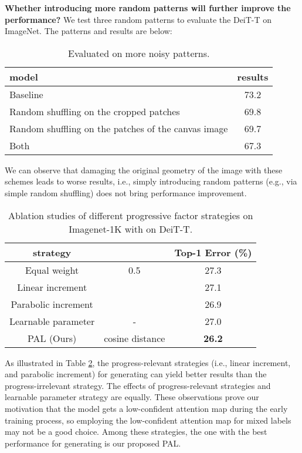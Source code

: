 \documentclass{article} \usepackage{iclr2023_conference,times}
\begin{document}
\textbf{Whether introducing more random patterns will further improve the performance?} We test three random patterns to evaluate the DeiT-T on ImageNet. The patterns and results are below:

\begin{table}[!htb]
\caption{Evaluated on more noisy patterns.}
\label{tabStra}
	\centering
	\begin{tabular}{lc}
    \toprule
     model  & results   \\
    \midrule

    Baseline   & 73.2   \\
    Random shuffling on the cropped patches	& 69.8\\
    Random shuffling on the patches of the canvas image & 69.7\\
    Both & 67.3\\
 
    \bottomrule
\end{tabular}
\end{table}
We can observe that damaging the original geometry of the image with these schemes leads to worse results, i.e., simply introducing random patterns (e.g., via simple random shuffling) does not bring performance improvement.

\begin{table}[!htb]
\caption{Ablation studies of different progressive factor strategies on Imagenet-1K with on DeiT-T.}
\label{tabStra}
	\centering
	\begin{tabular}{cc|c}
    \toprule
     strategy  &  & Top-1 Error (\%) \\
    \midrule

    Equal weight   & 0.5 & 27.3   \\
    
    Linear increment    &  & 27.1   \\
    
    Parabolic increment    &   & 26.9    \\
    Learnable parameter & - & 27.0  \\
    \midrule
    PAL (Ours)    & cosine distance  & \textbf{26.2}  \\
  
    \bottomrule
\end{tabular}
\end{table}

As illustrated in Table \ref{tabStra}, the progress-relevant strategies (i.e., linear increment, and parabolic increment) for generating  can yield better results than the progress-irrelevant strategy. The effects of progress-relevant strategies and learnable parameter strategy are equally. These observations prove our motivation that the model gets a low-confident attention map during the early training process, so employing the low-confident attention map for mixed labels may not be a good choice. Among these strategies, the one with the best performance for generating  is our proposed PAL.
\end{document}
